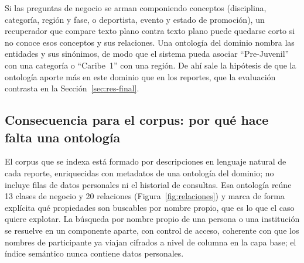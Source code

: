\documentclass[11pt,letterpaper]{article}
\numberwithin{equation}{section}
\begin{document}
Si las preguntas de negocio se arman componiendo conceptos (disciplina, categoría, región y fase, o deportista, evento y estado de promoción), un recuperador que compare texto plano contra texto plano puede quedarse corto si no conoce esos conceptos y sus relaciones. Una ontología del dominio nombra las entidades y sus sinónimos, de modo que el sistema pueda asociar ``Pre-Juvenil'' con una categoría o ``Caribe~1'' con una región. De ahí sale la hipótesis de que la ontología aporte más en este dominio que en los reportes, que la evaluación contrasta en la Sección~\ref{sec:res-final}.

\subsection{Consecuencia para el corpus: por qué hace falta una ontología}
El corpus que se indexa está formado por descripciones en lenguaje natural de cada reporte, enriquecidas con metadatos de una ontología del dominio; no incluye filas de datos personales ni el historial de consultas. Esa ontología reúne 13 clases de negocio y 20 relaciones (Figura~\ref{fig:relaciones}) y marca de forma explícita qué propiedades son buscables por nombre propio, que es lo que el caso quiere explotar. La búsqueda por nombre propio de una persona o una institución se resuelve en un componente aparte, con control de acceso, coherente con que los nombres de participante ya viajan cifrados a nivel de columna en la capa base; el índice semántico nunca contiene datos personales.
\end{document}
